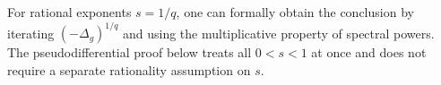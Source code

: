 \documentclass[12pt]{amsart}
\numberwithin{equation}{section}
\theoremstyle{definition}
\theoremstyle{remark}
\numberwithin{equation}{section}
\begin{document}
	
	
	
	
	For rational exponents $s=1/q$, one can formally obtain the conclusion by
	iterating $(-\Delta_g)^{1/q}$ and using the multiplicative property of spectral
	powers.  The pseudodifferential proof below treats all $0<s<1$ at once and does
	not require a separate rationality assumption on $s$.
	
\end{document}

